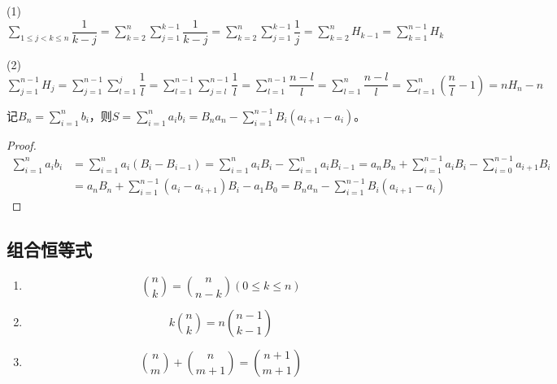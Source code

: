         \begin{solution}
            $ $

            (1)$\sum\limits_{1\leq j<k\leq n}\dfrac1{k-j}=\sum\limits_{k=2}^n\sum\limits_{j=1}^{k-1}\dfrac1{k-j}=\sum\limits_{k=2}^n\sum\limits_{j=1}^{k-1}\dfrac1j=\sum\limits_{k=2}^{n}H_{k-1}=\sum\limits_{k=1}^{n-1}H_{k}$

            (2)$\sum\limits_{j=1}^{n-1}H_{j}=\sum\limits_{j=1}^{n-1}\sum\limits_{l=1}^{j}\dfrac1l=\sum\limits_{l=1}^{n-1}\sum\limits_{j=l}^{n-1}\dfrac1l=\sum\limits_{l=1}^{n-1}\dfrac{n-l}l=\sum\limits_{l=1}^n\dfrac{n-l}l=\sum\limits_{l=1}^n\left(\dfrac{n}l-1\right)=nH_n-n$
        \end{solution}

        \begin{example}[(Abel)]
            记$B_n=\sum\limits_{i=1}^{n}b_i$，则$S=\sum\limits_{i=1}^{n}a_{i}b_i=B_{n}a_n-\sum\limits_{i=1}^{n-1}B_i(a_{i+1}-a_i)$。
        \end{example}

        \begin{proof}
            \begin{equation*}
                \begin{split}
                    \sum_{i=1}^{n}a_{i}b_i&=\sum_{i=1}^{n}a_{i}(B_i-B_{i-1})=\sum_{i=1}^{n}a_{i}B_{i}-\sum_{i=1}^{n}a_{i}B_{i-1}=a_{n}B_{n}+\sum_{i=1}^{n-1}a_{i}B_{i}-\sum_{i=0}^{n-1}a_{i+1}B_i \\
                                          &=a_{n}B_{n}+\sum_{i=1}^{n-1}(a_{i}-a_{i+1})B_i-a_{1}B_{0}=B_{n}a_n-\sum_{i=1}^{n-1}B_i(a_{i+1}-a_i)
                \end{split}
            \end{equation*}
        \end{proof}

    \subsection{组合恒等式}

        \begin{lemma}
            \label{lemma:combinatorial_identity}
            \begin{enumerate}
                \item
                    \begin{equation*}
                        \binom{n}{k}=\binom{n}{n-k}(0\leq k\leq n)
                    \end{equation*}
                \item
                    \begin{equation*}
                        k\binom{n}{k}=n\binom{n-1}{k-1}
                    \end{equation*}
                \item
                    \begin{equation*}
                        \binom{n}{m}+\binom{n}{m+1}=\binom{n+1}{m+1}
                    \end{equation*}
            \end{enumerate}
        \end{lemma}

